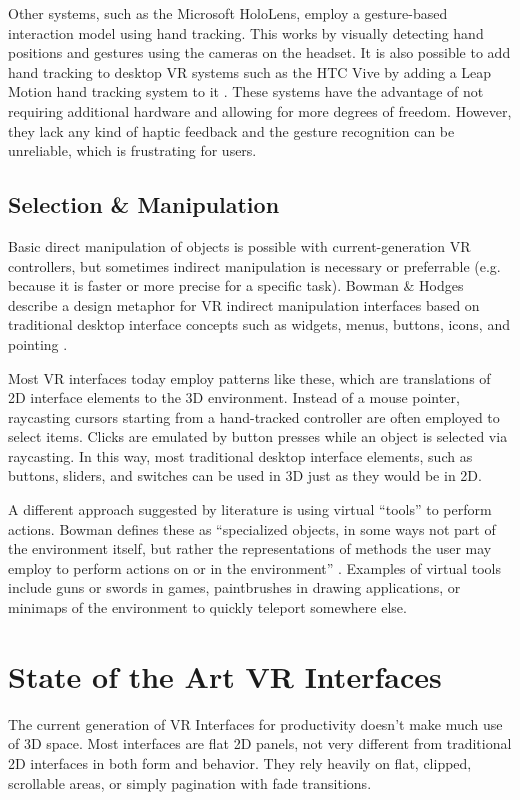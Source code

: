 \documentclass{tufte-book} %
\begin{document}
Other systems, such as the Microsoft HoloLens, employ a gesture-based interaction model using hand tracking. This works by visually detecting hand positions and gestures using the cameras on the headset. It is also possible to add hand tracking to desktop VR systems such as the HTC Vive by adding a Leap Motion hand tracking system to it \cite{wozniak2016possible}. These systems have the advantage of not requiring additional hardware and allowing for more degrees of freedom. However, they lack any kind of haptic feedback and the gesture recognition can be unreliable, which is frustrating for users.

\subsection{Selection \& Manipulation}
Basic direct manipulation of objects is possible with current-generation VR controllers, but sometimes indirect manipulation is necessary or preferrable (e.g. because it is faster or more precise for a specific task). Bowman \& Hodges describe a design metaphor for VR indirect manipulation interfaces based on traditional desktop interface concepts such as widgets, menus, buttons, icons, and pointing \cite{bowman1994wimp}.

Most VR interfaces today employ patterns like these, which are translations of 2D interface elements to the 3D environment. Instead of a mouse pointer, raycasting cursors starting from a hand-tracked controller are often employed to select items. Clicks are emulated by button presses while an object is selected via raycasting. In this way, most traditional desktop interface elements, such as buttons, sliders, and switches can be used in 3D just as they would be in 2D.

A different approach suggested by literature is using virtual ``tools'' to perform actions. Bowman defines these as ``specialized objects, in some ways not part of the environment itself, but rather the representations of methods the user may employ to perform actions on or in the environment'' \cite{bowman1995user}. Examples of virtual tools include guns or swords in games, paintbrushes in drawing applications, or minimaps of the environment to quickly teleport somewhere else.


\section{State of the Art VR Interfaces}
The current generation of VR Interfaces for productivity doesn't make much use of 3D space. Most interfaces are flat 2D panels, not very different from traditional 2D interfaces in both form and behavior. They rely heavily on flat, clipped, scrollable areas, or simply pagination with fade transitions.
\end{document}
